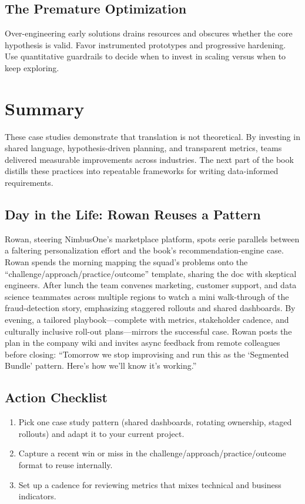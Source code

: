 \subsection{The Premature Optimization}
Over-engineering early solutions drains resources and obscures whether the core hypothesis is valid. Favor instrumented prototypes and progressive hardening. Use quantitative guardrails to decide when to invest in scaling versus when to keep exploring.

\section{Summary}
\label{sec:success-summary}

These case studies demonstrate that translation is not theoretical. By investing in shared language, hypothesis-driven planning, and transparent metrics, teams delivered measurable improvements across industries. The next part of the book distills these practices into repeatable frameworks for writing data-informed requirements.

\subsection{Day in the Life: Rowan Reuses a Pattern}
Rowan, steering NimbusOne’s marketplace platform, spots eerie parallels between a faltering personalization effort and the book’s recommendation-engine case. Rowan spends the morning mapping the squad's problems onto the ``challenge/approach/practice/outcome'' template, sharing the doc with skeptical engineers. After lunch the team convenes marketing, customer support, and data science teammates across multiple regions to watch a mini walk-through of the fraud-detection story, emphasizing staggered rollouts and shared dashboards. By evening, a tailored playbook—complete with metrics, stakeholder cadence, and culturally inclusive roll-out plans—mirrors the successful case. Rowan posts the plan in the company wiki and invites async feedback from remote colleagues before closing: ``Tomorrow we stop improvising and run this as the ‘Segmented Bundle’ pattern. Here’s how we’ll know it’s working.''

\subsection{Action Checklist}
\begin{enumerate}
    \item Pick one case study pattern (shared dashboards, rotating ownership, staged rollouts) and adapt it to your current project.
    \item Capture a recent win or miss in the challenge/approach/practice/outcome format to reuse internally.
    \item Set up a cadence for reviewing metrics that mixes technical and business indicators.
\end{enumerate}


